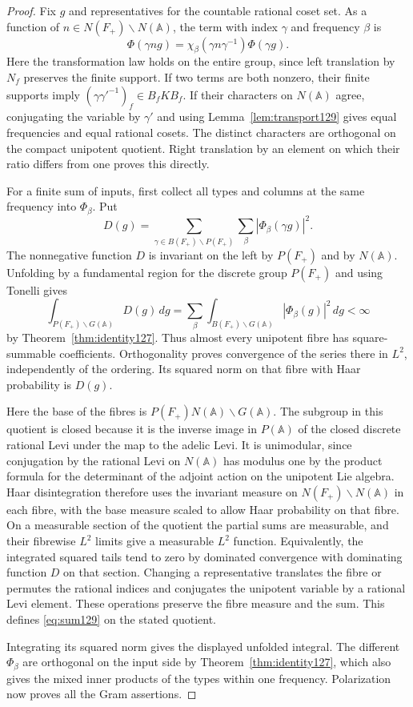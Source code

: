 \documentclass[a4paper,11pt]{article}
\theoremstyle{definition}
\theoremstyle{remark}
\numberwithin{equation}{section}
\begin{document}
\begin{proof}
Fix \(g\) and representatives for the countable rational coset set.
As a function of \(n\in N(F_+)\backslash N(\mathbb A)\), the term
with index \(\gamma\) and frequency \(\beta\) is
\[
      \Phi(\gamma n g)=
        \chi_\beta(\gamma n\gamma^{-1})\Phi(\gamma g).
\]
Here the transformation law holds on the entire group, since left
translation by \(N_f\) preserves the finite support. If two terms
are both nonzero, their finite supports imply
\((\gamma\gamma'^{-1})_f\in B_f K B_f\).
If their characters on \(N(\mathbb A)\) agree, conjugating the
variable by \(\gamma'\) and using Lemma~\ref{lem:transport129}
gives equal frequencies and equal rational cosets.
The distinct characters are orthogonal on the compact unipotent
quotient. Right translation by an element on which their ratio
differs from one proves this directly.

For a finite sum of inputs, first collect all types and columns
at the same frequency into \(\Phi_\beta\). Put
\[
    D(g)=\sum_{\gamma\in B(F_+)\backslash P(F_+)}
                  \sum_{\beta} |\Phi_\beta(\gamma g)|^2 .
\]
The nonnegative function \(D\) is invariant on the left by
\(P(F_+)\) and by \(N(\mathbb A)\). Unfolding by a fundamental
region for the discrete group \(P(F_+)\) and using Tonelli gives
\[
 \int_{P(F_+)\backslash G(\mathbb A)}D(g)\,dg
   =\sum_\beta\int_{B(F_+)\backslash G(\mathbb A)}
                              |\Phi_\beta(g)|^2\,dg<\infty
\]
by Theorem~\ref{thm:identity127}. Thus almost every unipotent
fibre has square-summable coefficients. Orthogonality proves
convergence of the series there in \(L^2\), independently of the
ordering. Its squared norm on that fibre with Haar probability
is \(D(g)\).

Here the base of the fibres is
\(P(F_+)N(\mathbb A)\backslash G(\mathbb A)\). The subgroup in
this quotient is closed because it is the inverse image in
\(P(\mathbb A)\) of the closed discrete rational Levi under the
map to the adelic Levi. It is unimodular, since conjugation by the rational
Levi on \(N(\mathbb A)\) has modulus one by the product formula
for the determinant of the adjoint action on the unipotent Lie
algebra. Haar disintegration therefore uses the invariant measure
on \(N(F_+)\backslash N(\mathbb A)\) in each fibre, with the base
measure scaled to allow Haar probability on that fibre. On a
measurable section of the quotient the partial sums are measurable,
and their fibrewise \(L^2\) limits give a measurable \(L^2\)
function. Equivalently, the integrated squared tails tend to zero
by dominated convergence with dominating function \(D\) on that
section. Changing a representative translates the fibre or
permutes the rational indices and conjugates the unipotent
variable by a rational Levi element. These operations preserve
the fibre measure and the sum. This defines \eqref{eq:sum129} on
the stated quotient.

Integrating its squared norm gives the displayed unfolded
integral. The different \(\Phi_\beta\) are orthogonal on the
input side by Theorem~\ref{thm:identity127}, which also gives
the mixed inner products of the types within one frequency.
Polarization now proves all the Gram assertions.
\end{proof}
\end{document}
